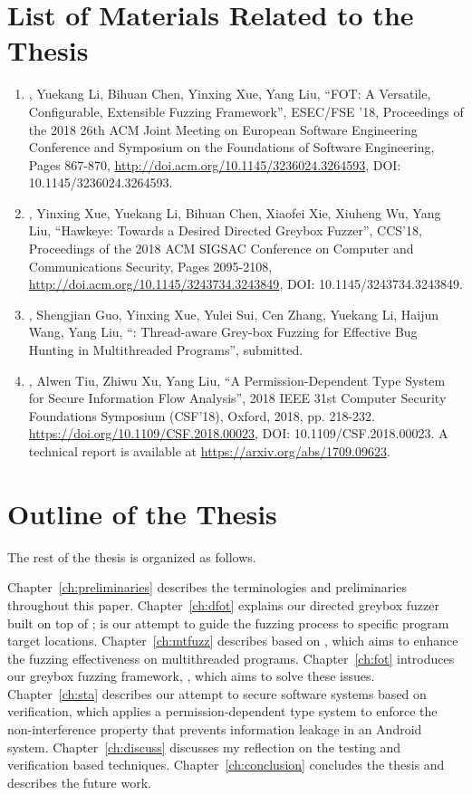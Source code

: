 \section{List of Materials Related to the Thesis}
\begin{enumerate}
	\item \myname, Yuekang Li, Bihuan Chen, Yinxing Xue, Yang Liu, ``FOT: A Versatile, Configurable, Extensible Fuzzing Framework'', ESEC/FSE '18, Proceedings of the 2018 26th ACM Joint Meeting on European Software Engineering Conference and Symposium on the Foundations of Software Engineering, Pages 867-870, \url{http://doi.acm.org/10.1145/3236024.3264593}, DOI: 10.1145/3236024.3264593.
	\item \myname, Yinxing Xue, Yuekang Li, Bihuan Chen, Xiaofei Xie, Xiuheng Wu, Yang Liu, ``Hawkeye: Towards a Desired Directed Greybox Fuzzer'', CCS'18, Proceedings of the 2018 ACM SIGSAC Conference on Computer and Communications Security, Pages 2095-2108, \url{http://doi.acm.org/10.1145/3243734.3243849}, DOI: 10.1145/3243734.3243849.
	\item \myname, Shengjian Guo, Yinxing Xue, Yulei Sui, Cen Zhang, Yuekang Li, Haijun Wang, Yang Liu, ``\mtfuzz: Thread-aware Grey-box Fuzzing for Effective Bug Hunting in Multithreaded Programs'', submitted.
	\item \myname, Alwen Tiu, Zhiwu Xu, Yang Liu, ``A Permission-Dependent Type System for Secure Information Flow Analysis'', 2018 IEEE 31st Computer Security Foundations Symposium (CSF'18), Oxford, 2018, pp. 218-232. \url{https://doi.org/10.1109/CSF.2018.00023}, DOI: 10.1109/CSF.2018.00023. A technical report is available at \url{https://arxiv.org/abs/1709.09623}.
\end{enumerate}

\section{Outline of the Thesis}

The rest of the thesis is organized as follows.

Chapter~\ref{ch:preliminaries} describes the terminologies and preliminaries throughout this paper. Chapter~\ref{ch:dfot} explains our directed greybox fuzzer \dFOT built on top of \FOT; \dFOT is our attempt to guide the fuzzing process to specific program target locations. Chapter~\ref{ch:mtfuzz} describes \mtfuzz based on \FOT, which aims to enhance the fuzzing effectiveness on multithreaded programs. Chapter~\ref{ch:fot} introduces our greybox fuzzing framework, \FOT, which aims to solve these issues.  Chapter~\ref{ch:sta} describes our attempt to secure software systems based on verification, which applies a permission-dependent type system to enforce the non-interference property that prevents information leakage in an Android system. Chapter~\ref{ch:discuss} discusses my reflection on the testing and verification based techniques. Chapter~\ref{ch:conclusion} concludes the thesis and describes the future work.
